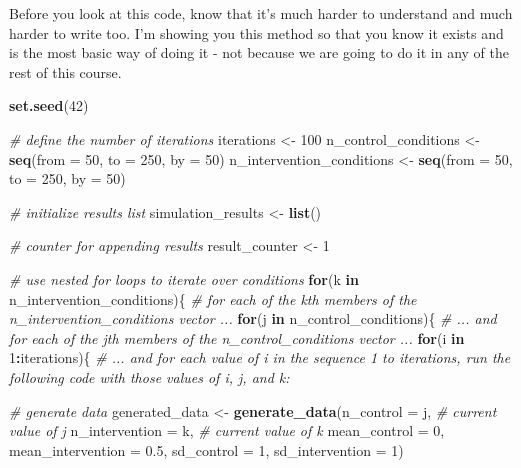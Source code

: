 \documentclass[
]{article}
\newenvironment{Shaded}{\begin{snugshade}}{\end{snugshade}}
\newcommand{\AttributeTok}[1]{\textcolor[rgb]{0.13,0.29,0.53}{#1}}
\newcommand{\CommentTok}[1]{\textcolor[rgb]{0.56,0.35,0.01}{\textit{#1}}}
\newcommand{\ControlFlowTok}[1]{\textcolor[rgb]{0.13,0.29,0.53}{\textbf{#1}}}
\newcommand{\DecValTok}[1]{\textcolor[rgb]{0.00,0.00,0.81}{#1}}
\newcommand{\FloatTok}[1]{\textcolor[rgb]{0.00,0.00,0.81}{#1}}
\newcommand{\FunctionTok}[1]{\textcolor[rgb]{0.13,0.29,0.53}{\textbf{#1}}}
\newcommand{\NormalTok}[1]{#1}
\newcommand{\OtherTok}[1]{\textcolor[rgb]{0.56,0.35,0.01}{#1}}
\newcommand{\SpecialCharTok}[1]{\textcolor[rgb]{0.81,0.36,0.00}{\textbf{#1}}}
\begin{document}
Before you look at this code, know that it's much harder to understand
and much harder to write too. I'm showing you this method so that you
know it exists and is the most basic way of doing it - not because we
are going to do it in any of the rest of this course.

\begin{Shaded}
\begin{Highlighting}[]
\FunctionTok{set.seed}\NormalTok{(}\DecValTok{42}\NormalTok{)}

\CommentTok{\# define the number of iterations}
\NormalTok{iterations }\OtherTok{\textless{}{-}} \DecValTok{100}
\NormalTok{n\_control\_conditions }\OtherTok{\textless{}{-}} \FunctionTok{seq}\NormalTok{(}\AttributeTok{from =} \DecValTok{50}\NormalTok{, }\AttributeTok{to =} \DecValTok{250}\NormalTok{, }\AttributeTok{by =} \DecValTok{50}\NormalTok{)}
\NormalTok{n\_intervention\_conditions }\OtherTok{\textless{}{-}} \FunctionTok{seq}\NormalTok{(}\AttributeTok{from =} \DecValTok{50}\NormalTok{, }\AttributeTok{to =} \DecValTok{250}\NormalTok{, }\AttributeTok{by =} \DecValTok{50}\NormalTok{)}

\CommentTok{\# initialize results list}
\NormalTok{simulation\_results }\OtherTok{\textless{}{-}} \FunctionTok{list}\NormalTok{()}

\CommentTok{\# counter for appending results}
\NormalTok{result\_counter }\OtherTok{\textless{}{-}} \DecValTok{1}

\CommentTok{\# use nested for loops to iterate over conditions}
\ControlFlowTok{for}\NormalTok{(k }\ControlFlowTok{in}\NormalTok{ n\_intervention\_conditions)\{ }\CommentTok{\# for each of the \textquotesingle{}k\textquotesingle{}{-}th members of the n\_intervention\_conditions vector ... }
  \ControlFlowTok{for}\NormalTok{(j }\ControlFlowTok{in}\NormalTok{ n\_control\_conditions)\{ }\CommentTok{\# ... and for each of the \textquotesingle{}j\textquotesingle{}{-}th members of the n\_control\_conditions vector ...}
    \ControlFlowTok{for}\NormalTok{(i }\ControlFlowTok{in} \DecValTok{1}\SpecialCharTok{:}\NormalTok{iterations)\{ }\CommentTok{\# ... and for each value of \textquotesingle{}i\textquotesingle{} in the sequence 1 to iterations, run the following code with those values of i, j, and k:}
      
      \CommentTok{\# generate data}
\NormalTok{      generated\_data }\OtherTok{\textless{}{-}} \FunctionTok{generate\_data}\NormalTok{(}\AttributeTok{n\_control =}\NormalTok{ j,  }\CommentTok{\# current value of j}
                                      \AttributeTok{n\_intervention =}\NormalTok{ k,  }\CommentTok{\# current value of k}
                                      \AttributeTok{mean\_control =} \DecValTok{0}\NormalTok{,}
                                      \AttributeTok{mean\_intervention =} \FloatTok{0.5}\NormalTok{,}
                                      \AttributeTok{sd\_control =} \DecValTok{1}\NormalTok{,}
                                      \AttributeTok{sd\_intervention =} \DecValTok{1}\NormalTok{)}
      

\end{Highlighting}
\end{Shaded}
\end{document}

